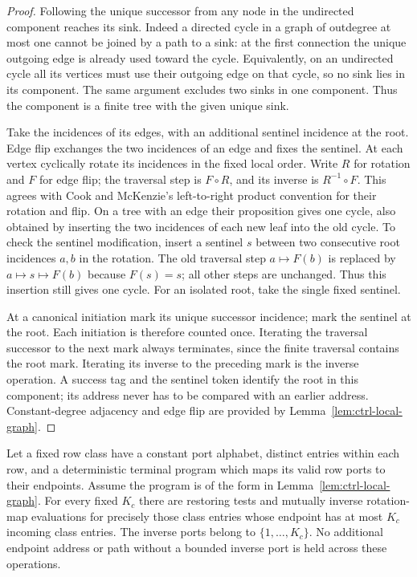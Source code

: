 \begin{proof}
Following the unique successor from any node in the undirected
component reaches its sink.  Indeed a directed cycle in a graph of
outdegree at most one cannot be joined by a path to a sink: at the
first connection the unique outgoing edge is already used toward the
cycle.  Equivalently, on an undirected cycle all its vertices must use
their outgoing edge on that cycle, so no sink lies in its component.
The same argument excludes two sinks in one component.  Thus the
component is a finite tree with the given unique sink.

Take the incidences of its edges, with an additional sentinel incidence
at the root.  Edge flip exchanges the two incidences of an edge and
fixes the sentinel.  At each vertex cyclically rotate its incidences in
the fixed local order.  Write $R$ for rotation and $F$ for edge flip; the traversal step is
$F\circ R$, and its inverse is $R^{-1}\circ F$. This agrees with
Cook and McKenzie's left-to-right product convention for their
rotation and flip. On a tree with an edge their proposition gives
one cycle, also obtained by inserting the two incidences of each
new leaf into the old cycle. To check the sentinel modification,
insert a sentinel $s$ between two consecutive root incidences
$a,b$ in the rotation. The old traversal step $a\mapsto F(b)$
is replaced by $a\mapsto s\mapsto F(b)$ because $F(s)=s$;
all other steps are unchanged. Thus this insertion still gives
one cycle. For an isolated root, take the single fixed sentinel.

At a canonical initiation mark its unique successor incidence; mark
the sentinel at the root.  Each initiation is therefore counted once.
Iterating the traversal successor to the next mark always terminates,
since the finite traversal contains the root mark.  Iterating its inverse
to the preceding mark is the inverse operation.  A success tag and the
sentinel token identify the root in this component; its address never
has to be compared with an earlier address.  Constant-degree adjacency
and edge flip are provided by Lemma~\ref{lem:ctrl-local-graph}.
\end{proof}

\begin{lemma}\label{lem:ctrl-cap}
Let a fixed row class have a constant port alphabet, distinct entries
within each row, and a deterministic terminal program which maps its
valid row ports to their endpoints.  Assume the program is of the form
in Lemma~\ref{lem:ctrl-local-graph}.  For every fixed $K_c$ there are
restoring tests and mutually inverse rotation-map evaluations for precisely those
class entries whose endpoint has at most $K_c$ incoming class entries.
The inverse ports belong to $\{1,\ldots,K_c\}$.  No additional endpoint
address or path without a bounded inverse port is held across these operations.
\end{lemma}

